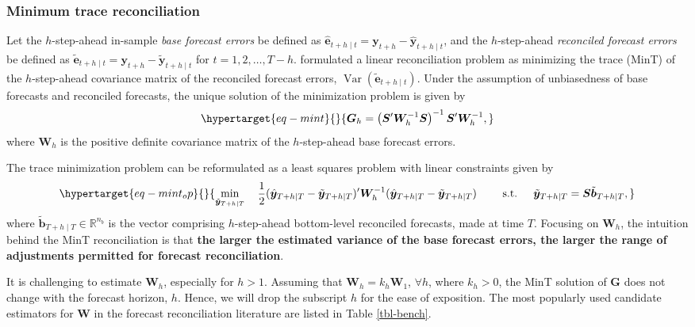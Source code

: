 \documentclass[
  12pt,
  11pt]{article}
\begin{document}
\hypertarget{minimum-trace-reconciliation}{%
\subsubsection{Minimum trace
reconciliation}\label{minimum-trace-reconciliation}}

Let the \(h\)-step-ahead in-sample \emph{base forecast errors} be
defined as
\(\hat{\bm{e}}_{t+h \mid t} = \bm{y}_{t+h} - \hat{\bm{y}}_{t+h \mid t}\),
and the \(h\)-step-ahead \emph{reconciled forecast errors} be defined as
\(\tilde{\bm{e}}_{t+h \mid t} = \bm{y}_{t+h} - \tilde{\bm{y}}_{t+h \mid t}\)
for \(t = 1,2,\ldots,T-h\). \citet{Wickramasuriya2019-fc} formulated a
linear reconciliation problem as minimizing the trace (MinT) of the
\(h\)-step-ahead covariance matrix of the reconciled forecast errors,
\(\operatorname{Var}(\tilde{\bm{e}}_{t+h \mid t})\). Under the
assumption of unbiasedness of base forecasts and reconciled forecasts,
the unique solution of the minimization problem is given by
\begin{equation}\protect\hypertarget{eq-mint}{}{
\bm{G}_h=\left(\bm{S}^{\prime} \bm{W}_h^{-1} \bm{S}\right)^{-1} \bm{S}^{\prime} \bm{W}_h^{-1},
}\label{eq-mint}\end{equation} where \(\bm{W}_h\) is the positive
definite covariance matrix of the \(h\)-step-ahead base forecast errors.

The trace minimization problem can be reformulated as a least squares
problem with linear constraints given by
\begin{equation}\protect\hypertarget{eq-mint_op}{}{
 \min _{\tilde{\bm{y}}_{T+h \mid T}} \quad \frac{1}{2}(\hat{\bm{y}}_{T+h \mid T}-\tilde{\bm{y}}_{T+h \mid T})^{\prime} \bm{W}_{h}^{-1}(\hat{\bm{y}}_{T+h \mid T}-\tilde{\bm{y}}_{T+h \mid T})
 \qquad \text { s.t. } \quad \tilde{\bm{y}}_{T+h \mid T}=\bm{S}\tilde{\bm{b}}_{T+h \mid T},
}\label{eq-mint_op}\end{equation} where
\(\tilde{\bm{b}}_{T+h \mid T} \in \mathbb{R}^{n_b}\) is the vector
comprising \(h\)-step-ahead bottom-level reconciled forecasts, made at
time \(T\). Focusing on \(\bm{W}_h\), the intuition behind the MinT
reconciliation is that \textbf{the larger the estimated variance of the
base forecast errors, the larger the range of adjustments permitted for
forecast reconciliation}.

It is challenging to estimate \(\bm{W}_h\), especially for \(h > 1\).
Assuming that \(\bm{W}_h = k_h\bm{W}_1\), \(\forall h\), where
\(k_h > 0\), the MinT solution of \(\bm{G}\) does not change with the
forecast horizon, \(h\). Hence, we will drop the subscript \(h\) for the
ease of exposition. The most popularly used candidate estimators for
\(\bm{W}\) in the forecast reconciliation literature are listed in Table
\ref{tbl-bench}.
\end{document}

